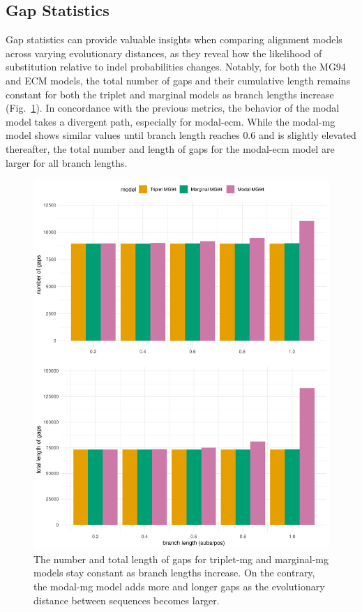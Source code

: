 \subsection{Gap Statistics} %

Gap statistics can provide valuable insights when comparing alignment models across varying evolutionary distances, as they reveal how the likelihood of substitution relative to indel probabilities changes. Notably, for both the MG94 and ECM models, the total number of gaps and their cumulative length remains constant for both the triplet and marginal models as branch lengths increase (Fig.~\ref{fig:results_tri_mar_mg_gaps}). In concordance with the previous metrics, the behavior of the modal model takes a divergent path, especially for modal-ecm. While the modal-mg model shows similar values until branch length reaches $0.6$ and is slightly elevated thereafter, the total number and length of gaps for the modal-ecm model are larger for all branch lengths.

\begin{figure}[!ht]
\centering
\includegraphics[width = 0.75\linewidth]{chapter3/figures/results/results_marginal_triplet_mg_gaps.pdf}
 \vspace{1mm}
 \caption[MG94 Dataset Indel Statistics]{The number and total length of gaps for triplet-mg and marginal-mg models stay constant as branch lengths increase. On the contrary, the modal-mg model adds more and longer gaps as the evolutionary distance between sequences becomes larger.}
 \label{fig:results_tri_mar_mg_gaps}
\end{figure}

